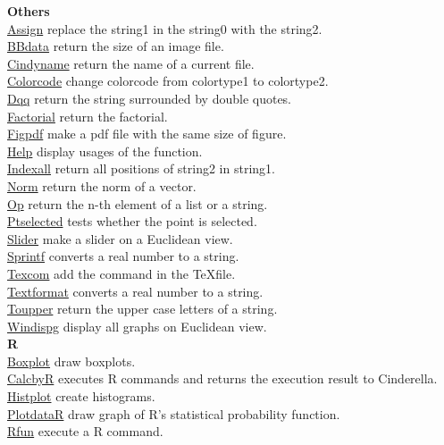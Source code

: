 \documentclass[papersize,a4paper,12pt]{article}
\begin{document}
\begin{tabbing}
{\bf Others} \> \\
\hyperlink{assign}{Assign} \> replace the string1 in the string0 with the string2.\\
\hyperlink{bbdata}{BBdata} \> return the size of an image file.\\
\hyperlink{cindyname}{Cindyname} \> return the name of a current file.\\
\hyperlink{colorcode}{Colorcode} \> change colorcode from colortype1 to colortype2.\\
\hyperlink{dqq}{Dqq} \> return the string surrounded by double quotes.\\
\hyperlink{factorial}{Factorial} \> return the factorial.\\
\hyperlink{figpdf}{Figpdf} \> make a pdf file with the same size of figure.\\
\hyperlink{help}{Help} \> display usages of the function.\\
\hyperlink{indexall}{Indexall} \>return all positions of string2 in string1.\\
\hyperlink{norml}{Norm} \> return the norm of a vector.\\
\hyperlink{opl}{Op} \> return the n-th element of a list or a string.\\
\hyperlink{ptselected}{Ptselected} \> tests whether the point is selected.\\
\hyperlink{slider}{Slider} \> make a slider on a Euclidean view.\\
\hyperlink{sprintf}{Sprintf} \> converts a real number to a string.\\
\hyperlink{texcom}{Texcom} \> add the command in the \TeX file.\\
\hyperlink{textformat}{Textformat} \> converts a real number to a string.\\
\hyperlink{toupper}{Toupper} \> return the upper case letters of a string.\\
\hyperlink{windispg}{Windispg} \> display all graphs on Euclidean view.\\

{\bf R} \> \\
\hyperlink{boxplot}{Boxplot} \> draw boxplots.\\
\hyperlink{calcbyr}{CalcbyR} \> executes R commands and returns the execution result to Cinderella.\\
\hyperlink{histplot}{Histplot} \> create histograms.\\
\hyperlink{plotdatar}{PlotdataR} \>draw graph of R's statistical probability function.\\
\hyperlink{rfun}{Rfun} \>execute a R command.\\


\end{tabbing}
\end{document}
